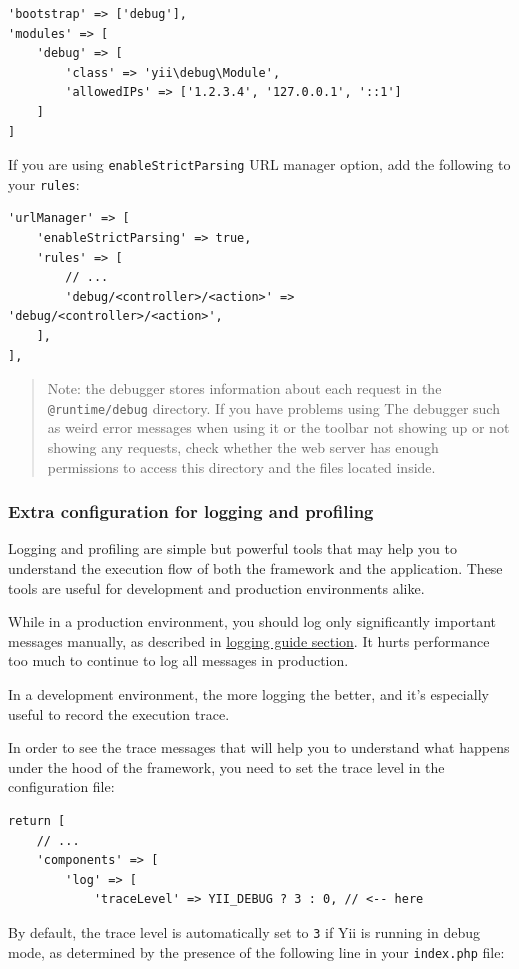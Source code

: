 \lstset{language=php}\begin{lstlisting}
'bootstrap' => ['debug'],
'modules' => [
    'debug' => [
        'class' => 'yii\debug\Module',
        'allowedIPs' => ['1.2.3.4', '127.0.0.1', '::1']
    ]
]
\end{lstlisting}
If you are using \lstinline|enableStrictParsing| URL manager option, add the following to your \lstinline|rules|:

\lstset{language=php}\begin{lstlisting}
'urlManager' => [
    'enableStrictParsing' => true,
    'rules' => [
        // ...
        'debug/<controller>/<action>' => 'debug/<controller>/<action>',
    ],
],
\end{lstlisting}
\begin{quote}Note: the debugger stores information about each request in the \lstinline|@runtime/debug| directory. If you have problems using
The debugger such as weird error messages when using it or the toolbar not showing up or not showing any requests, check
whether the web server has enough permissions to access this directory and the files located inside.

\end{quote}
\subsubsection{Extra configuration for logging and profiling}
Logging and profiling are simple but powerful tools that may help you to understand the execution flow of both the
framework and the application. These tools are useful for development and production environments alike.

While in a production environment, you should log only significantly important  messages manually, as described in
\hyperref[logging.md]{logging guide section}. It hurts performance too much to continue to log all messages in production.

In a development environment, the more logging the better, and it's especially useful to record the execution trace.

In order to see the trace messages that will help you to understand what happens under the hood of the framework, you need to set the
trace level in the configuration file:

\lstset{language=php}\begin{lstlisting}
return [
    // ...
    'components' => [
        'log' => [
            'traceLevel' => YII_DEBUG ? 3 : 0, // <-- here
\end{lstlisting}
By default, the trace level is automatically set to \lstinline|3| if Yii is running in debug mode, as determined by the presence of the following line in your \lstinline|index.php| file:

